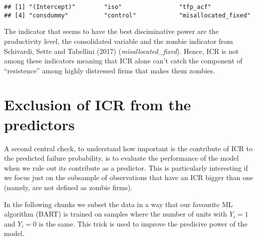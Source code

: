 \documentclass[]{article}
\newenvironment{Shaded}{\begin{snugshade}}{\end{snugshade}}
\newcommand{\DecValTok}[1]{\textcolor[rgb]{0.00,0.00,0.81}{#1}}
\newcommand{\KeywordTok}[1]{\textcolor[rgb]{0.13,0.29,0.53}{\textbf{#1}}}
\newcommand{\NormalTok}[1]{#1}
\newcommand{\OperatorTok}[1]{\textcolor[rgb]{0.81,0.36,0.00}{\textbf{#1}}}
\newcommand{\StringTok}[1]{\textcolor[rgb]{0.31,0.60,0.02}{#1}}
\begin{document}
\begin{verbatim}
## [1] "(Intercept)"        "iso"                "tfp_acf"           
## [4] "consdummy"          "control"            "misallocated_fixed"
\end{verbatim}

The indicator that seems to have the best disciminative power are the
productivity level, the consolidated variable and the zombie indicator
from Schivardi, Sette and Tabellini (2017)
(\textit{misallocated\_fixed}). Hence, ICR is not among these indicators
meaning that ICR alone can't catch the component of ``resistence'' among
highly distressed firms that makes them zombies.

\hypertarget{exclusion-of-icr-from-the-predictors}{%
\section{Exclusion of ICR from the
predictors}\label{exclusion-of-icr-from-the-predictors}}

A second central check, to understand how important is the contribute of
ICR to the predicted failure probability, is to evaluate the performance
of the model when we rule out its contribute as a predictor. This is
particularly interesting if we focus just on the subsample of
observations that have an ICR bigger than one (namely, are not defined
as zombie firms).

\par

In the following chunks we subset the data in a way that our favourite
ML algorithm (BART) is trained on samples where the number of units with
\(Y_i=1\) and \(Y_i=0\) is the same. This trick is used to improve the
predicive power of the model.

\begin{Shaded}
\end{Shaded}
\end{document}
